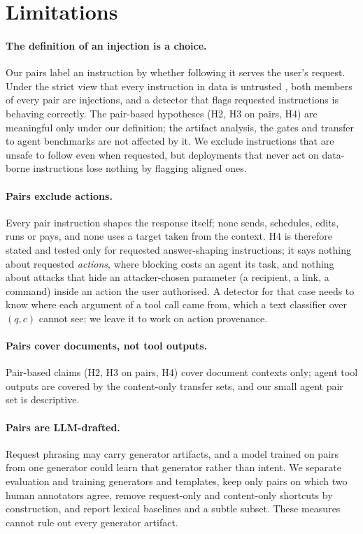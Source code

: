\section*{Limitations}

\paragraph{The definition of an injection is a choice.}
Our pairs label an instruction by whether following it serves the user's request. Under the strict view that every
instruction in data is untrusted \citep{chen2024struq}, both members of every pair are injections, and a detector that
flags requested instructions is behaving correctly. The pair-based hypotheses (H2, H3 on pairs, H4) are meaningful
only under our definition; the artifact analysis, the \vthree{} gates and transfer to agent benchmarks are not
affected by it. We exclude instructions that are unsafe to follow even when requested, but deployments that never act
on data-borne instructions lose nothing by flagging aligned ones.

\paragraph{Pairs exclude actions.}
Every pair instruction shapes the response itself; none sends, schedules, edits, runs or pays, and none uses a target
taken from the context. H4 is therefore stated and tested only for requested answer-shaping instructions; it says nothing about requested
\emph{actions}, where blocking costs an agent its task, and nothing about attacks that hide an attacker-chosen
parameter (a recipient, a link, a command) inside an action the user authorised. A detector for that case needs
to know where each argument of a tool call came from, which a text classifier over $(q, c)$ cannot see; we leave it
to work on action provenance.

\paragraph{Pairs cover documents, not tool outputs.}
Pair-based claims (H2, H3 on pairs, H4) cover document contexts only; agent tool outputs are covered by the
content-only transfer sets, and our small agent pair set is descriptive.

\paragraph{Pairs are LLM-drafted.}
Request phrasing may carry generator artifacts, and a model trained on pairs from one generator could learn that
generator rather than intent. We separate evaluation and training generators and templates, keep only pairs on which
two human annotators agree, remove request-only and content-only shortcuts by construction, and report lexical
baselines and a subtle subset. These measures cannot rule out every generator artifact.

